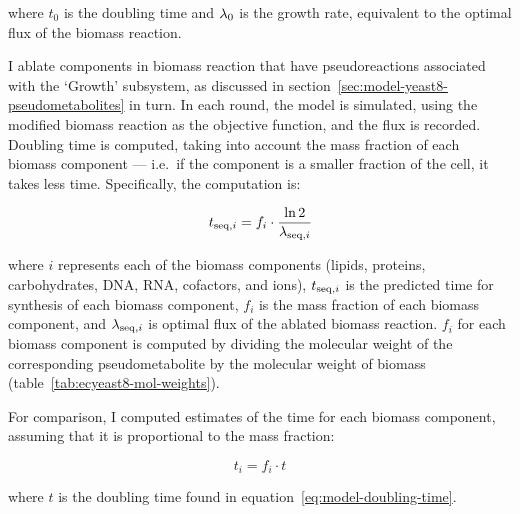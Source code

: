 where $t_{0}$ is the doubling time and $\lambda_{0}$ is the growth rate, equivalent to the optimal flux of the biomass reaction.

I ablate components in biomass reaction that have pseudoreactions associated with the `Growth' subsystem, as discussed in section~\ref{sec:model-yeast8-pseudometabolites} in turn.
In each round, the model is simulated, using the modified biomass reaction as the objective function, and the flux is recorded.
Doubling time is computed, taking into account the mass fraction of each biomass component --- i.e.\ if the component is a smaller fraction of the cell, it takes less time.
Specifically, the computation is:

\begin{equation}
  t_{\mathrm{seq},i} = f_{i} \cdot \frac{\ln 2}{\lambda_{\mathrm{seq},i}}
  \label{eq:model-ablated-time}
\end{equation}

where $i$ represents each of the biomass components (lipids, proteins, carbohydrates, DNA, RNA, cofactors, and ions), $t_{\mathrm{seq},i}$ is the predicted time for synthesis of each biomass component, $f_{i}$ is the mass fraction of each biomass component, and $\lambda_{\mathrm{seq},i}$ is optimal flux of the ablated biomass reaction.
$f_{i}$ for each biomass component is computed by dividing the molecular weight of the corresponding pseudometabolite by the molecular weight of biomass (table~\ref{tab:ecyeast8-mol-weights}).

For comparison, I computed estimates of the time for each biomass component, assuming that it is proportional to the mass fraction:

\begin{equation}
  t_{i} = f_{i} \cdot t
  \label{eq:model-proportional-time}
\end{equation}

where $t$ is the doubling time found in equation~\ref{eq:model-doubling-time}.


